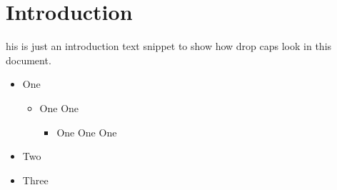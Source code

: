 
\section{Introduction}

 his is just an introduction text snippet to show how drop caps look in this document.
\lipsum[1]

\begin{itemize}
	\item One
		\begin{itemize}
			\item One One
				\begin{itemize}
					\item One One One
				\end{itemize}
		\end{itemize}
	\item Two
	\item Three
\end{itemize}

\lipsum[1-2]

